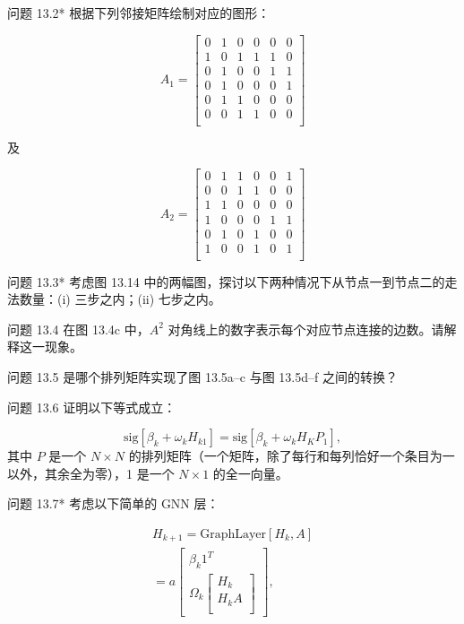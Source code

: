 问题 13.2* 根据下列邻接矩阵绘制对应的图形：

\begin{equation}
A_1 =
\begin{bmatrix}
0 & 1 & 0 & 0 & 0 & 0 \\
1 & 0 & 1 & 1 & 1 & 0 \\
0 & 1 & 0 & 0 & 1 & 1 \\
0 & 1 & 0 & 0 & 0 & 1 \\
0 & 1 & 1 & 0 & 0 & 0 \\
0 & 0 & 1 & 1 & 0 & 0 \\
\end{bmatrix}
\end{equation}

及

\begin{equation}
A_2 =
\begin{bmatrix}
0 & 1 & 1 & 0 & 0 & 1 \\
0 & 0 & 1 & 1 & 0 & 0 \\
1 & 1 & 0 & 0 & 0 & 0 \\
1 & 0 & 0 & 0 & 1 & 1 \\
0 & 1 & 0 & 1 & 0 & 0 \\
1 & 0 & 0 & 1 & 0 & 1 \\
\end{bmatrix}
\end{equation}

问题 13.3* 考虑图 13.14 中的两幅图，探讨以下两种情况下从节点一到节点二的走法数量：(i) 三步之内；(ii) 七步之内。

问题 13.4 在图 13.4c 中，\(A^2\) 对角线上的数字表示每个对应节点连接的边数。请解释这一现象。

问题 13.5 是哪个排列矩阵实现了图 13.5a–c 与图 13.5d–f 之间的转换？

问题 13.6 证明以下等式成立：

\begin{equation}
\text{sig}[\beta_k + \omega_k H_{k1}] = \text{sig}[\beta_k + \omega_k H_K P_{1}], 
\end{equation}
其中 \(P\) 是一个 \(N \times N\) 的排列矩阵（一个矩阵，除了每行和每列恰好一个条目为一以外，其余全为零），1 是一个 \(N \times 1\) 的全一向量。

问题 13.7* 考虑以下简单的 GNN 层：


\begin{align}
H_{k+1} = \text{GraphLayer}[H_k, A] \\
= a \left[
\begin{array}{c}
\beta_k 1^T \\
\Omega_k \left[ \begin{array}{c}
H_k \\
H_k A \\
\end{array} \right]
\end{array}
\right], 
\end{align} 


